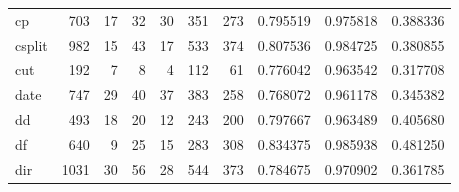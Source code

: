 \begin{longtable}{lrrrrrrrrr}
cp        &                    703 &                                 17 &                                32 &                               30 &                               351 &                             273 &                                0.795519 &                               0.975818 &                             0.388336 \\
csplit    &                    982 &                                 15 &                                43 &                               17 &                               533 &                             374 &                                0.807536 &                               0.984725 &                             0.380855 \\
cut       &                    192 &                                  7 &                                 8 &                                4 &                               112 &                              61 &                                0.776042 &                               0.963542 &                             0.317708 \\
date      &                    747 &                                 29 &                                40 &                               37 &                               383 &                             258 &                                0.768072 &                               0.961178 &                             0.345382 \\
dd        &                    493 &                                 18 &                                20 &                               12 &                               243 &                             200 &                                0.797667 &                               0.963489 &                             0.405680 \\
df        &                    640 &                                  9 &                                25 &                               15 &                               283 &                             308 &                                0.834375 &                               0.985938 &                             0.481250 \\
dir       &                   1031 &                                 30 &                                56 &                               28 &                               544 &                             373 &                                0.784675 &                               0.970902 &                             0.361785 \\

\end{longtable}
